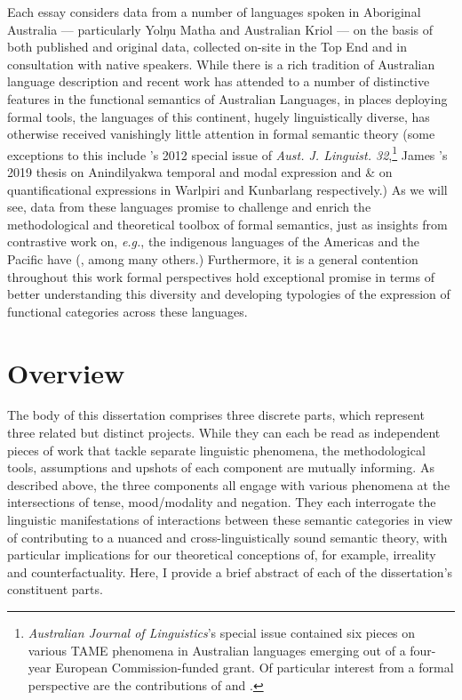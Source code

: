 \documentclass[11pt,dvipsnames]{report}
\begin{document}
Each essay considers data from a number of languages spoken in Aboriginal Australia --- particularly Yolŋu Matha and Australian Kriol --- on the basis of both published and original data, collected on-site in the Top End and in consultation with native speakers. While there is a rich tradition of Australian language description and recent work has attended to a number of distinctive features in the functional semantics of Australian Languages, in places deploying formal tools, the languages of this continent, hugely linguistically diverse, has otherwise received vanishingly little attention in formal semantic theory (some exceptions to this include \citeauthor{Stirling2012}'s 2012 special issue of \textit{Aust. J. Linguist. 32},\footnote{\textit{Australian Journal of Linguistics}'s special issue contained six pieces on various TAME phenomena in Australian languages emerging out of a four-year European Commission-funded grant. Of particular interest from a formal perspective are the contributions of \citet{Caudal2012} and \citet{Ritz2012}.} James \citeauthor{Bednall2019}'s 2019 thesis on Anindilyakwa temporal and modal expression and \citealt{Bowler2014} \& \citealt{Kapitonov2018} on quantificational expressions in Warlpiri and Kunbarlang respectively.) As we will see, data from these languages promise to challenge and enrich the methodological and theoretical toolbox of formal semantics, just as insights from contrastive work on, \textit{e.g.}, the indigenous languages of the Americas and the Pacific have (\citealp[\textit{e.g.},][]{Matthewson2006,Tonhauser2007,Krifka2016,VonPrince2018,Bochnak2019}, among many others.) Furthermore, it is a general contention throughout this work formal perspectives hold exceptional promise in terms of better understanding this diversity and developing typologies of the expression of functional categories across these languages.

\section{Overview}\label{sec:overview}


The body of this dissertation comprises three discrete parts, which represent three related but distinct projects. While they can each be read as independent pieces of work that tackle separate linguistic phenomena, the methodological tools, assumptions and upshots of each component are mutually informing. As described above, the three components all engage with various phenomena at the intersections of tense, mood/modality and negation. They each interrogate the linguistic manifestations of interactions between these semantic categories in view of contributing to a nuanced and cross-linguistically sound semantic theory, with particular implications for our theoretical conceptions of, for example, irreality and counterfactuality. Here, I provide a brief abstract of each of the dissertation's constituent parts.
\end{document}
